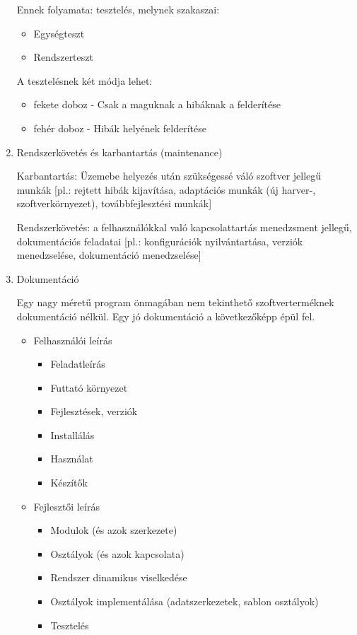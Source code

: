 \documentclass[margin=0px]{article}
\begin{document}
\begin{enumerate}
          Ennek folyamata: tesztelés, melynek szakaszai:
          \begin{itemize}
              \item Egységteszt
              \item Rendszerteszt
          \end{itemize}
          A tesztelésnek két módja lehet:
          \begin{itemize}
              \item fekete doboz - Csak a maguknak a hibáknak a felderítése
              \item fehér doboz - Hibák helyének felderítése
          \end{itemize}

    \item Rendszerkövetés és karbantartás (maintenance)

          Karbantartás: Üzemebe helyezés után szükségessé váló szoftver jellegű munkák [pl.: rejtett hibák kijavítása, adaptációs munkák (új harver-, szoftverkörnyezet), továbbfejlesztési munkák]

          Rendszerkövetés: a felhasználókkal való kapcsolattartás menedzsment jellegű, dokumentációs feladatai [pl.: konfigurációk nyilvántartása, verziók menedzselése, dokumentáció menedzselése]

    \item Dokumentáció

          Egy nagy méretű program önmagában nem tekinthető szoftverterméknek
          dokumentáció nélkül. Egy jó dokumentáció a következőképp épül fel.
          \begin{itemize}
              \item Felhasználói leírás
                    \begin{itemize}
                        \item Feladatleírás
                        \item Futtató környezet
                        \item Fejlesztések, verziók
                        \item Installálás
                        \item Használat
                        \item Készítők
                    \end{itemize}
              \item Fejlesztői leírás
                    \begin{itemize}
                        \item Modulok (és azok szerkezete)
                        \item Osztályok (és azok kapcsolata)
                        \item Rendszer dinamikus viselkedése
                        \item Osztályok implementálása (adatszerkezetek, sablon osztályok)
                        \item Tesztelés
                    \end{itemize}
          \end{itemize}
\end{enumerate}
\end{document}
